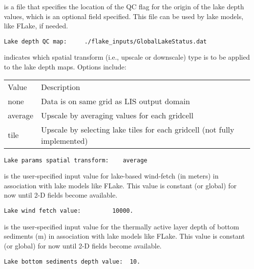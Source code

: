  
  is a file that specifies the location
 of the QC flag for the origin of the lake depth values, which is
 an optional field specified.
 This file can be used by lake models, like FLake, if needed.
 

 \begin{Verbatim}[frame=single]
Lake depth QC map:     ./flake_inputs/GlobalLakeStatus.dat   
 \end{Verbatim}

 
  indicates which spatial transform
 (i.e., upscale or downscale) type is to be applied to the lake depth 
 maps.  Options include:

 \begin{tabular}{ll}
 Value   & Description                                             \\
 none    &  Data is on same grid as LIS output domain              \\
 average &  Upscale by averaging values for each gridcell          \\
 tile    &  Upscale by selecting lake tiles for each gridcell (not
            fully implemented)                                     \\
 \end{tabular}
 

 \begin{Verbatim}[frame=single]
Lake params spatial transform:    average
 \end{Verbatim}

 
  is the user-specified input value 
 for lake-based wind-fetch (in meters) in association with lake
 models like FLake.  This value is constant (or global) for now
 until 2-D fields become available.
 

 \begin{Verbatim}[frame=single]
Lake wind fetch value:         10000.                
 \end{Verbatim}

 
  is the user-specified
 input value for the thermally active layer depth of bottom
 sediments (m) in association with lake models like FLake.
 This value is constant (or global) for now until 2-D fields
 become available.
 

 \begin{Verbatim}[frame=single]
Lake bottom sediments depth value:  10.                  
 \end{Verbatim}

